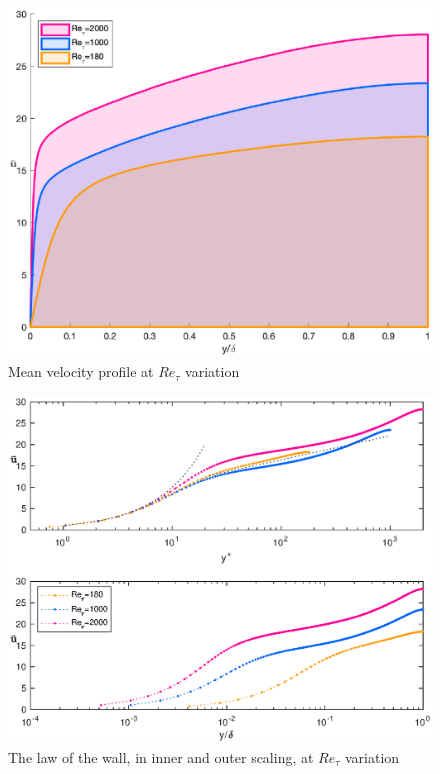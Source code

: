 \begin{figure}
\begin{center}
\includegraphics[scale=0.55]{grafici/u_mean_comparison.eps}
\caption{Mean velocity profile at $Re_{\tau}$ variation}
\label{mean:comparison}
\end{center}
\end{figure}
\begin{figure}
\begin{center}
\includegraphics[scale=0.55]{grafici/loglaw_comparison.eps}
\caption{The law of the wall, in inner and outer scaling, at $Re_{\tau}$ variation}
\label{loglaw:comparison}
\end{center}
\end{figure}


